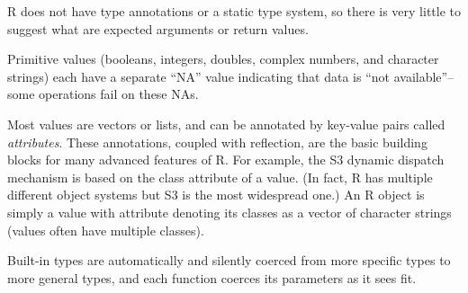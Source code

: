 \documentclass[sigplan,anonymous,review]{acmart}
\begin{document}
\begin{compactitem}[$-$]

\item R does not have type annotations or a static type system, so there is very little to suggest what are expected arguments or return values.

\item Primitive values (booleans, integers, doubles, complex numbers, and character strings) each have a separate ``NA'' value indicating that data is ``not available''--some operations fail on these NAs.

\item Most values are vectors or lists, and can be annotated by key-value pairs called \textit{attributes}. 
These annotations, coupled with reflection, are the basic building blocks for many advanced features of R. 
For example, the S3 dynamic dispatch mechanism is based on the class attribute of a value.
(In fact, R has multiple different object systems but S3 is the most widespread one.)
An R object is simply a value with  attribute denoting its classes as a vector of character strings (values often have multiple classes).

\item Built-in types are automatically and silently coerced from more specific types to more general types, and each function coerces its parameters as it sees fit.




\end{compactitem}
\end{document}
